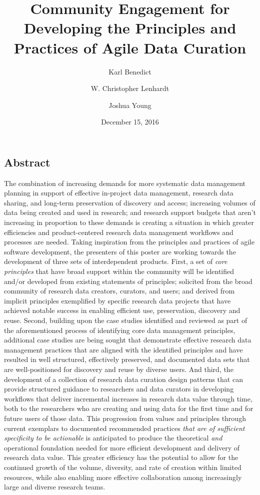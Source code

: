 \documentclass[final]{beamer}
\title
[International Digital Curation Conference. Edinburgh, Scotland. February
20-23, 2017.] %
{ %
Community Engagement for Developing the Principles and Practices of
Agile Data Curation
}
\author{ %
Karl Benedict\inst{1} \and W. Christopher Lenhardt\inst{2} \and Joshua Young\inst{3}}
\institute{
\inst{1} University of New Mexico
\inst{2} Renaissance Computing Institute
\inst{3} University Corporation for Atmospheric Research
}
\date{December 15, 2016}
\begin{document}
\begin{frame}[t]
\begin{multicols}{2}


\subsection{Abstract}

The combination of increasing demands for more systematic data
management planning in support of effective in-project data management,
research data sharing, and long-term preservation of discovery and
access; increasing volumes of data being created and used in research;
and research support budgets that aren't increasing in proportion to
these demands is creating a situation in which greater efficiencies and
product-centered research data management workflows and processes are
needed. Taking inspiration from the principles and practices of agile
software development, the presenters of this poster are working towards
the development of three sets of interdependent products. First, a set
of \emph{core principles} that have broad support within the community
will be identified and/or developed from existing statements of
principles; solicited from the broad community of research data
creators, curators, and users; and derived from implicit principles
exemplified by specific research data projects that have achieved
notable success in enabling efficient use, preservation, discovery and
reuse. Second, building upon the case studies identified and reviewed as
part of the aforementioned process of identifying core data management
principles, additional case studies are being sought that demonstrate
effective research data management practices that are aligned with the
identified principles and have resulted in well structured, effectively
preserved, and documented data sets that are well-positioned for
discovery and reuse by diverse users. And third, the development of a
collection of research data curation design patterns that can provide
structured guidance to researchers and data curators in developing
workflows that deliver incremental increases in research data value
through time, both to the researchers who are creating and using data
for the first time and for future users of those data. This progression
from values and principles through current exemplars to documented
recommended practices \emph{that are of sufficient specificity to be
actionable} is anticipated to produce the theoretical \emph{and}
operational foundation needed for more efficient development and
delivery of research data value. This greater efficiency has the
potential to allow for the continued growth of the volume, diversity,
and rate of creation within limited resources, while also enabling more
effective collaboration among increasingly large and diverse research
teams.


\end{multicols}
\end{frame}
\end{document}
